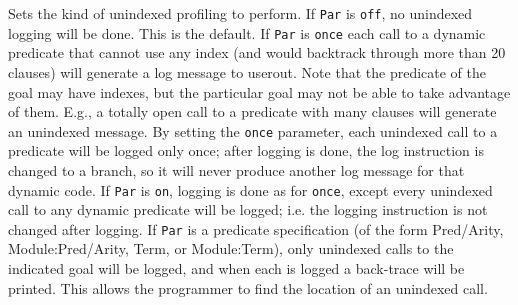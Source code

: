 \begin{description}

Sets the kind of unindexed profiling to perform.  If {\tt Par} is
\texttt{off},  no
unindexed logging will be done.  This is the default.  If {\tt Par}
is \texttt{once}  each call to a dynamic predicate that cannot use any index (and
would backtrack through more than 20 clauses) will generate a log
message to userout.  Note that the predicate of the goal may have indexes,
but the particular goal may not be able to take advantage of them.
E.g., a totally open call to a predicate with many clauses will generate an unindexed message.
By setting the {\tt once} parameter, each unindexed call to a predicate will be logged
only once; after logging is done, the log instruction is changed to a
branch, so it will never produce another log message for that dynamic
code.  If {\tt Par} is \texttt{on}, logging is done as for \texttt{once}, except every
unindexed call to any dynamic predicate will be logged; i.e. the
logging instruction is not changed after logging.  If {\tt Par} is a
predicate specification (of the form Pred/Arity, Module:Pred/Arity,
Term, or Module:Term), only unindexed calls to the indicated goal will
be logged, and when each is logged a back-trace will be printed.  This
allows the programmer to find the location of an unindexed call.
\end{description}

